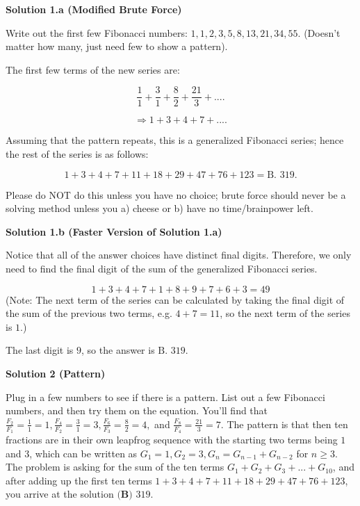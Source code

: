 \begin{enumerate}
\textbf{Solution 1.a (Modified Brute Force)}

Write out the first few Fibonacci numbers: $1, 1, 2, 3, 5, 8, 13, 21, 34, 55.$ (Doesn't matter how many, just need few to show a pattern). 

 The first few terms of the new series are: 

 
 \[\frac{1}{1} + \frac{3}{1} + \frac{8}{2} + \frac{21}{3} + ... .\]

 \[\Rightarrow 1 + 3 + 4+ 7 + ... .\]

 Assuming that the pattern repeats, this is a generalized Fibonacci series; hence the rest of the series is as follows: 

 
 \[1 + 3 + 4 + 7 + 11 + 18 + 29 + 47 + 76 + 123 = \boxed{\text{B. } 319}.\]

 Please do NOT do this unless you have no choice; brute force should never be a solving method unless you a) cheese or b) have no time/brainpower left.

 



\textbf{Solution 1.b (Faster Version of Solution 1.a)}

Notice that all of the answer choices have distinct final digits. Therefore, we only need to find the final digit of the sum of the generalized Fibonacci series.

 
 \[1 + 3 + 4 + 7 + 1 + 8 + 9 + 7 + 6 + 3 = 49\](Note: The next term of the series can be calculated by taking the final digit of the sum of the previous two terms, e.g. $4 + 7 = 11$, so the next term of the series is $1$.)

 The last digit is $9$, so the answer is $\boxed{\text{B. } 319}$.

 



\textbf{Solution 2 (Pattern)}

Plug in a few numbers to see if there is a pattern. List out a few Fibonacci numbers, and then try them on the equation. You'll find that ${\frac{F_2}{F_1}} = {\frac{1}{1}} = 1, {\frac{F_4}{F_2}} = {\frac{3}{1}} = 3, {\frac{F_6}{F_3}} = {\frac{8}{2}} = 4,$ and ${\frac{F_8}{F_4}} = {\frac{21}{3}} = 7.$ The pattern is that then ten fractions are in their own leapfrog sequence with the starting two terms being $1$ and $3$, which can be written as $G_1 = 1, G_2 = 3, G_n = G_{n-1} + G_{n-2}$ for $n \geq 3.$ The problem is asking for the sum of the ten terms $G_1 + G_2 + G_3 + ... + G_{10}$, and after adding up the first ten terms $1 + 3 + 4 + 7 + 11 + 18 + 29 + 47 + 76 + 123$, you arrive at the solution $\boxed{\textbf{(B) }319}.$


\end{enumerate}

